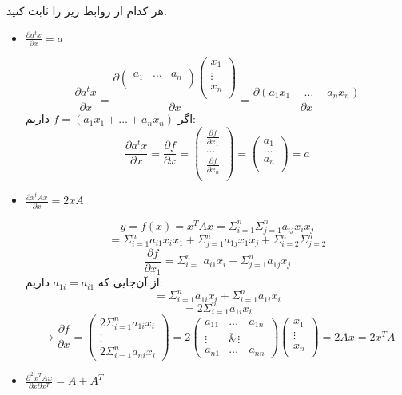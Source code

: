 
هر کدام از روابط زیر را ثابت کنید.
\begin{itemize}
	\item 
	$\frac{\partial a^tx}{\partial x} = a$
	
	$$
	\frac{\partial a^tx}{\partial x} = 
	\frac{\partial \begin{pmatrix}
		a_1 & \dots & a_n \\
		\end{pmatrix}
		\begin{pmatrix}
		x_1 \\
		\vdots \\
		x_n \\
		\end{pmatrix}}{\partial x}
	= \frac{\partial (a_1x_1 + \dots + a_nx_n)}{\partial x}
	$$
	اگر $f = (a_1x_1 + \dots + a_nx_n)$ داریم:
	$$
	\frac{\partial a^tx}{\partial x} = 	\frac{\partial f}{\partial x} = 
	\begin{pmatrix}
		\frac{\partial f}{\partial x_1} \\
		 \dots \\ \frac{\partial f}{\partial x_n}\\
	\end{pmatrix} =
	\begin{pmatrix}
	a_1 \\
	\dots \\
	 a_n \\
	\end{pmatrix}
	= a
	$$
	
	\item 
	$\frac{\partial x^tAx}{\partial x} = 2xA$
	
	$$
	y = f(x) = x^TAx = \Sigma_{i = 1}^{n}\Sigma_{j = 1}^{n}a_{ij}x_{i}x_{j}
	$$
	$$
	= \Sigma_{i = 1}^{n}a_{i1}x_{i}x_{1} + \Sigma_{j = 1}^{n}a_{1j}x_{1}x_{j} + \Sigma_{i = 2}^{n}\Sigma_{j = 2}^{n}
	$$
	$$
	\frac{\partial f}{\partial x_{1}} = 
	\Sigma_{i = 1}^{n}a_{i1}x_{i} + \Sigma_{j = 1}^{n}a_{1j}x_j
	$$
	از آن‌جایی که $a_{1i} = a_{i1}$ داریم:
	$$
	= \Sigma_{i = 1}^{n}a_{1i}x_{i} + \Sigma_{i = 1}^{n} a_{1i}x_{i}
	$$
	$$
	= 2 \Sigma_{i = 1}^{n}a_{1i}x_i
	$$
	$$
	\rightarrow \frac{\partial f}{\partial x} = \begin{pmatrix}
	2\Sigma_{i = 1}^{n}a_{1i}x_{i} \\
	\vdots \\
		2\Sigma_{i = 1}^{n}a_{ni}x_{i}
	\end{pmatrix}
	= 2 \begin{pmatrix}
	a_{11} & \dots & a_{1n}\\
	\vdots & \ddot & \vdots \\
	a_{n1} & \dots & a_{nn}
	\end{pmatrix}
	\begin{pmatrix}
	x_1 \\
	\vdots \\
	x_n \\
	\end{pmatrix}
	= 2Ax = 2x^TA
	$$ 
	\item 
	$\frac{\partial^2 x^TAx}{\partial x \partial x^T} = A + A^T$
	

\end{itemize}
